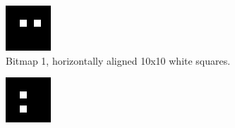 \documentclass[12pt]{article}
\begin{document}
\begin{figure}[ht]
\centering
\begin{subfigure}[b]{.3\linewidth}
\includegraphics[width=\linewidth]{squares-horizontal.png}
\caption{Bitmap 1, horizontally aligned 10x10 white squares.}
\label{fig:squares-horizontal}
\end{subfigure}
\hspace{2mm}
\begin{subfigure}[b]{.3\linewidth}
\includegraphics[width=\linewidth]{squares-vertical.png}

\end{subfigure}
\end{figure}
\end{document}
